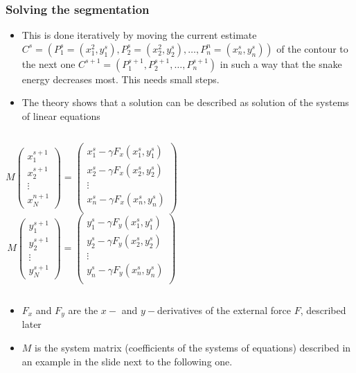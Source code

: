 \documentclass[10pt]{beamer}
\begin{document}
 \begin{frame}
  \frametitle{Solving the segmentation}
  {\small
    \begin{itemize}
     \item This is done iteratively by moving the current estimate $C^s = (P_1^s =
       (x_1^2,y_1^s), P_2^s = (x_2^2,y_2^s),\dots, P_n^n = (x_n^s,y_n^s))$ of the contour to
       the next one $C^{s+1} = (P_1^{s+1},P_2^{s+1},\dots,P_n^{s+1})$ in such a way that the
       snake energy decreases most.  This needs small steps.
     \item The theory shows that a solution can be described as solution of the systems of
       linear equations
     \end{itemize}
   }
   \begin{columns}
     {\small $$ M 
       \begin{pmatrix}
         x^{s+1}_1\\x^{s+1}_2\\\vdots\\x^{n+1}_N
       \end{pmatrix}
       = \begin{pmatrix}
         x^{s}_1 - \gamma F_x(x_1^{s},y_1^{s})\\
         x^{s}_2 - \gamma F_x(x_2^{s},y_2^{s})\\
         \vdots\\
         x^{s}_n - \gamma F_x(x_n^{s},y_n^{s})\\
       \end{pmatrix}
       $$}
     {\small $$ M 
       \begin{pmatrix}
         y^{s+1}_1\\y^{s+1}_2\\\vdots\\y^{s+1}_N
       \end{pmatrix}
       = \begin{pmatrix}
         y^{s}_1 - \gamma F_y(x_1^{s},y_1^{s})\\
         y^{s}_2 - \gamma F_y(x_2^{s},y_2^{s})\\
         \vdots\\
         y^{s}_n - \gamma F_y(x_n^{s},y_n^{s})\\
       \end{pmatrix}
       $$}
   \end{columns}
   {\small
     \begin{itemize}
     \item $F_x$ and $F_y$ are the $x-$ and $y-$derivatives of the external force $F$, described later
     \item $M$ is the system matrix (coefficients of the systems of equations) described
       in an example in the slide next to the following one.
     \end{itemize}
   }
 \end{frame}
 
\end{document}

